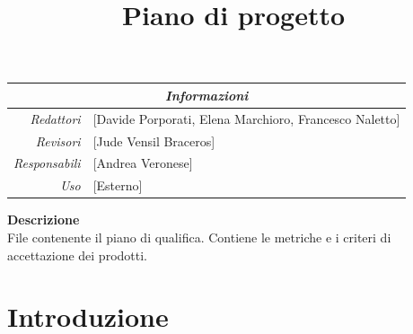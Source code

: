 \documentclass[12pt]{article}
\begin{document}
\graphicspath{ {../templates/img/} {./img}}

\title{Piano di progetto}

\firstPage



\maketitle

\begin{center}
	\begin{tabular}{r | l}
		\multicolumn{2}{c}{\textit{Informazioni}}                         \\
		\hline

		\textit{Redattori}    &
		[Davide Porporati, Elena Marchioro, Francesco Naletto]\makecell{} \\

		\textit{Revisori}     &
		[Jude Vensil Braceros]\makecell{}                                 \\
		\textit{Responsabili} &
		[Andrea Veronese]\makecell{}                                      \\
		\textit{Uso}          &
		[Esterno]\makecell{}                                              \\
	\end{tabular}
\end{center}

\begin{center}
	\textbf{Descrizione}\\
	File contenente il piano di qualifica. Contiene le metriche e i criteri di accettazione dei prodotti.
\end{center}

\pagebreak

\tableofcontents
\pagebreak

\printindex

\makeversioni

\section{Introduzione}
\end{document}
